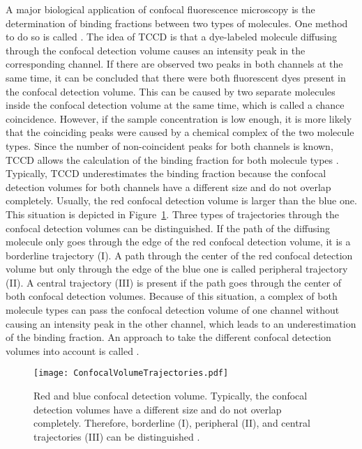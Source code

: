 A major biological application of confocal fluorescence microscopy is the determination of binding fractions between two types of molecules. One method to do so is called . The idea of \gls{TCCD} is that a dye-labeled molecule diffusing through the confocal detection volume causes an intensity peak in the corresponding channel. If there are observed two peaks in both channels at the same time, it can be concluded that there were both fluorescent dyes present in the confocal detection volume. This can be caused by two separate molecules inside the confocal detection volume at the same time, which is called a chance coincidence. However, if the sample concentration is low enough, it is more likely that the coinciding peaks were caused by a chemical complex of the two molecule types. Since the number of non-coincident peaks for both channels is known, \gls{TCCD} allows the calculation of the binding fraction for both molecule types \cite{Orte2010}.\\

Typically, \gls{TCCD} underestimates the binding fraction because the confocal detection volumes for both channels have a different size and do not overlap completely. Usually, the red confocal detection volume is larger than the blue one. This situation is depicted in Figure~\ref{fig:ConfocalVolumeTrajectories}. Three types of trajectories through the confocal detection volumes can be distinguished. If the path of the diffusing molecule only goes through the edge of the red confocal detection volume, it is a borderline trajectory (I). A path through the center of the red confocal detection volume but only through the edge of the blue one is called peripheral trajectory (II). A central trajectory (III) is present if the path goes through the center of both confocal detection volumes. Because of this situation, a complex of both molecule types can pass the confocal detection volume of one channel without causing an intensity peak in the other channel, which leads to an underestimation of the binding fraction. An approach to take the different confocal detection volumes into account is called  \cite{Hoefig2020}.\\ 

\begin{figure}[h]
	\centering
	\texttt{[image: ConfocalVolumeTrajectories.pdf]}
	\caption[Different size and incomplete overlap of confocal detection volumes]{Red and blue confocal detection volume. Typically, the confocal detection volumes have a different size and do not overlap completely. Therefore, borderline (I), peripheral (II), and central trajectories (III) can be distinguished \cite{Hoefig2020}.}
	\label{fig:ConfocalVolumeTrajectories}
\end{figure}

